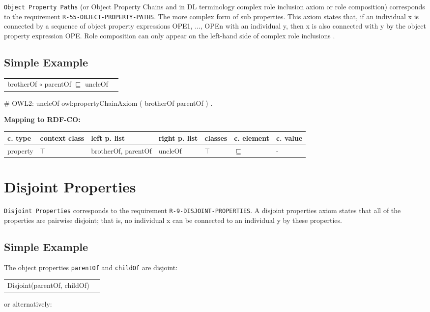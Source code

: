 \documentclass{llncs}
\newcommand{\ms}[1]{\texttt{#1}}
\newenvironment{gcotable}{
  \scriptsize
  \sffamily
  \vspace{0cm}
	\begin{center}
	\textbf{\vspace{0.4cm}Mapping to RDF-CO:} \\
  \begin{tabular}{l|l|l|l|l|l|l}
	\hline
  \textbf{c. type} & \textbf{context class} & \textbf{left p. list} & \textbf{right p. list} & \textbf{classes} & \textbf{c. element} & \textbf{c. value} \\
  \hline

}{
  \hline
  \end{tabular}
	\end{center}
}
\newenvironment{DL}{
  \vspace{0cm}
	\begin{center}
  \begin{tabular}{r l}

}{
  \end{tabular}
	\end{center}
}
\begin{document}
\ms{Object Property Paths} (or Object Property Chains and in DL terminology complex role inclusion axiom or role composition)
corresponds to the requirement \ms{R-55-OBJECT-PROPERTY-PATHS}.
The more complex form of sub properties. This axiom states that, if an individual x is connected by a sequence of object property expressions OPE1, ..., OPEn with an individual y, then x is also connected with y by the object property expression OPE.  
Role composition can only appear on the left-hand side of complex role inclusions \cite{Kroetzsch2012}.

\subsection{Simple Example}

\begin{DL}
brotherOf $\circ$ parentOf $\sqsubseteq$ uncleOf 
\end{DL}

\begin{ex}
# OWL2:
uncleOf owl:propertyChainAxiom ( brotherOf parentOf ) . 
\end{ex}

\begin{gcotable}
property & $\top$ & brotherOf, parentOf & uncleOf & $\top$ & $\sqsubseteq$ & -  \\
\end{gcotable}

\section{Disjoint Properties}

\ms{Disjoint Properties} corresponds to the requirement \ms{R-9-DISJOINT-PROPERTIES}.
A disjoint properties axiom states that all of the properties are pairwise disjoint; 
that is, no individual x can be connected to an individual y by these properties. 

\subsection{Simple Example}

The object properties \ms{parentOf} and \ms{childOf} are disjoint:

\begin{DL}
Disjoint(parentOf, childOf)\\
\end{DL}

or alternatively:
\end{document}

